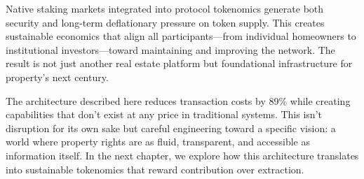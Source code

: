 Native staking markets integrated into protocol tokenomics generate both security and long-term deflationary pressure on token supply. This creates sustainable economics that align all participants—from individual homeowners to institutional investors—toward maintaining and improving the network. The result is not just another real estate platform but foundational infrastructure for property's next century.

The architecture described here reduces transaction costs by 89\% while creating capabilities that don't exist at any price in traditional systems. This isn't disruption for its own sake but careful engineering toward a specific vision: a world where property rights are as fluid, transparent, and accessible as information itself. In the next chapter, we explore how this architecture translates into sustainable tokenomics that reward contribution over extraction.